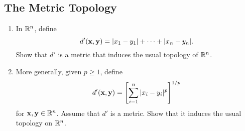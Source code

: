 \subsection{The Metric Topology}

\begin{exercise}[ID=2.20.1]
    \begin{enumerate}[label={(\alph*)}, align=left, leftmargin=\parindent, listparindent=\parindent, labelwidth=0pt, itemindent=!]
        \item In $\mathbb{R}^n$, define
        \begin{equation*}
            d'(\mathbf{x}, \mathbf{y}) = |x_1 - y_1| + \cdots + |x_n - y_n|.
        \end{equation*}
        Show that $d'$ is a metric that induces the usual topology of $\mathbb{R}^n$.
        \item  More generally, given $p \geq 1$, define
        \begin{equation*}
            d'(\mathbf{x}, \mathbf{y}) = \left[\sum_{i=1}^n |x_i - y_i|^p\right]^{1/p}
        \end{equation*}
        for $\mathbf{x}, \mathbf{y} \in \mathbb{R}^n$.
        Assume that $d'$ is a metric.
        Show that it induces the usual topology on $\mathbb{R}^n$.
    \end{enumerate}
\end{exercise}

